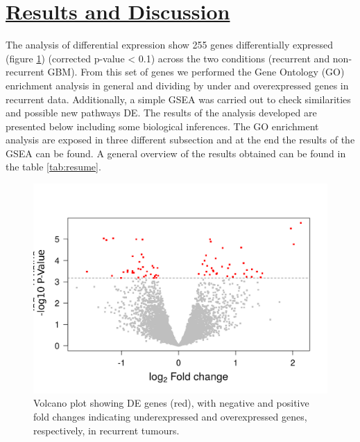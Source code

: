 \documentclass[9pt,twocolumn,twoside]{gsajnl}
\begin{document}
\section*{\underline{Results and Discussion}}

The analysis of differential expression show 255 genes differentially expressed (figure \ref{fig:volcano}) (corrected p-value < 0.1) across the two conditions (recurrent and non-recurrent GBM). From this set of genes we performed the Gene Ontology (GO) enrichment analysis in general and dividing by under and overexpressed genes in recurrent data. Additionally, a simple GSEA was carried out to check similarities and possible new pathways DE. The results of the analysis developed are presented below including some biological inferences. The GO enrichment analysis are exposed in three different subsection and at the end the results of the GSEA can be found. A general overview of the results obtained can be found in the table \ref{tab:resume}.

\begin{figure}[!h]
	\centering
	\includegraphics[scale=0.4]{volcano.png}
	\caption{Volcano plot showing DE genes (red), with negative and positive fold changes indicating underexpressed and overexpressed genes, respectively, in recurrent tumours.}
	\label{fig:volcano}
\end{figure}
\end{document}
